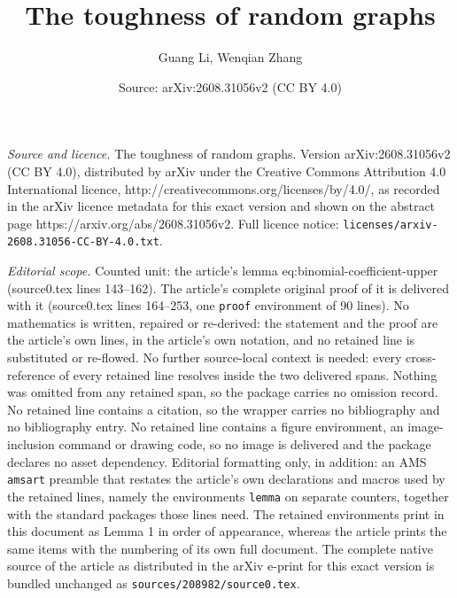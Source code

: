 \documentclass[10pt,a4paper]{amsart}
\title{The toughness of random graphs}
\author{Guang Li, Wenqian Zhang}
\date{Source: arXiv:2608.31056v2 (CC BY 4.0)}
\begin{document}
\maketitle

\noindent\emph{Source and licence.} The toughness of random graphs. Version arXiv:2608.31056v2 (CC BY 4.0), distributed by arXiv under the Creative Commons Attribution 4.0 International licence, http://creativecommons.org/licenses/by/4.0/, as recorded in the arXiv licence metadata for this exact version and shown on the abstract page https://arxiv.org/abs/2608.31056v2. Full licence notice: \texttt{licenses/arxiv-2608.31056-CC-BY-4.0.txt}.\par\smallskip

\noindent\textit{Editorial scope.} Counted unit: the article's lemma eq:binomial-coefficient-upper (source0.tex lines 143--162). The article's complete original proof of it is delivered with it (source0.tex lines 164--253, one \texttt{proof} environment of 90 lines). No mathematics is written, repaired or re-derived: the statement and the proof are the article's own lines, in the article's own notation, and no retained line is substituted or re-flowed.  No further source-local context is needed: every cross-reference of every retained line resolves inside the two delivered spans.  Nothing was omitted from any retained span, so the package carries no omission record.  No retained line contains a citation, so the wrapper carries no bibliography and no bibliography entry.  No retained line contains a figure environment, an image-inclusion command or drawing code, so no image is delivered and the package declares no asset dependency.  Editorial formatting only, in addition: an AMS \texttt{amsart} preamble that restates the article's own declarations and macros used by the retained lines, namely the environments \texttt{lemma} on separate counters, together with the standard packages those lines need.  The retained environments print in this document as Lemma 1 in order of appearance, whereas the article prints the same items with the numbering of its own full document.  The complete native source of the article as distributed in the arXiv e-print for this exact version is bundled unchanged as \texttt{sources/208982/source0.tex}.
\end{document}
